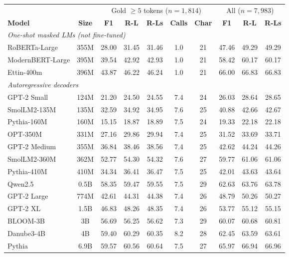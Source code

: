 \begin{table}[t]
\centering
\begin{tabular}{lccccccccc}
\toprule
& & \multicolumn{5}{c}{Gold $\geq 5$ tokens ($n = 1{,}814$)} & \multicolumn{3}{c}{All ($n = 7{,}983$)} \\
\textbf{Model} & \textbf{Size} & \textbf{F1} & \textbf{R-L} & \textbf{R-Ls} & \textbf{Calls} & \textbf{Char} & \textbf{F1} & \textbf{R-L} & \textbf{R-Ls} \\
\midrule
\multicolumn{10}{l}{\textit{One-shot masked LMs (not fine-tuned)}} \\
RoBERTa-Large & 355M & 28.00 & 31.45 & 31.46 & 1.0 & 21 & 47.46 & 49.29 & 49.29 \\
ModernBERT-Large & 395M & 39.54 & 42.92 & 42.93 & 1.0 & 21 & 58.42 & 60.17 & 60.17 \\
Ettin-400m & 396M & 43.87 & 46.22 & 46.24 & 1.0 & 21 & 66.00 & 66.83 & 66.83 \\
\midrule
\multicolumn{10}{l}{\textit{Autoregressive decoders}} \\
GPT-2 Small & 124M & 21.20 & 24.50 & 24.55 & 7.4 & 24 & 26.03 & 28.64 & 28.65 \\
SmolLM2-135M & 135M & 32.59 & 34.92 & 34.95 & 7.6 & 25 & 40.88 & 42.66 & 42.67 \\
Pythia-160M & 160M & 15.15 & 18.87 & 18.89 & 7.5 & 24 & 19.33 & 22.18 & 22.18 \\
OPT-350M & 331M & 27.16 & 29.86 & 29.94 & 7.4 & 25 & 31.52 & 33.69 & 33.71 \\
GPT-2 Medium & 355M & 36.84 & 38.46 & 38.56 & 7.4 & 25 & 42.62 & 44.24 & 44.26 \\
SmolLM2-360M & 362M & 52.77 & 54.30 & 54.32 & 7.6 & 27 & 59.77 & 61.06 & 61.06 \\
Pythia-410M & 410M & 34.34 & 36.41 & 36.47 & 7.5 & 25 & 42.01 & 43.63 & 43.64 \\
Qwen2.5 & 0.5B & 58.35 & 59.47 & 59.55 & 7.5 & 29 & 62.63 & 63.76 & 63.78 \\
GPT-2 Large & 774M & 42.61 & 44.31 & 44.38 & 7.4 & 26 & 48.79 & 50.26 & 50.27 \\
GPT-2 XL & 1.5B & 46.83 & 48.26 & 48.35 & 7.4 & 26 & 53.77 & 55.12 & 55.15 \\
BLOOM-3B & 3B & 56.69 & 56.25 & 56.62 & 7.3 & 29 & 60.07 & 60.68 & 60.81 \\
Danube3-4B & 4B & 59.40 & 60.29 & 60.35 & 8.2 & 28 & 62.45 & 63.59 & 63.61 \\
Pythia & 6.9B & 59.57 & 60.56 & 60.64 & 7.5 & 27 & 65.97 & 66.94 & 66.96 \\

\end{tabular}
\end{table}
